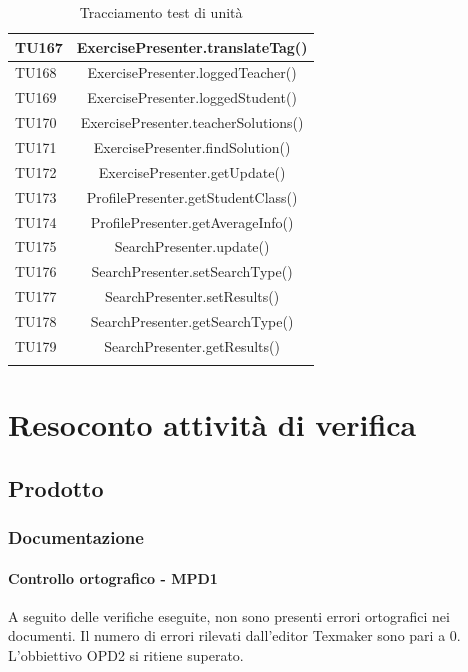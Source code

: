 \begin{longtable}{|>{\centering\arraybackslash}m{1.6cm}|c|}
		TU167 & ExercisePresenter.translateTag()\\ \hline
		TU168 & ExercisePresenter.loggedTeacher()\\ \hline
		\rowcolor{LightGray}
		TU169 & ExercisePresenter.loggedStudent()\\ \hline
		TU170 & ExercisePresenter.teacherSolutions()\\ \hline
		\rowcolor{LightGray}
		TU171 & ExercisePresenter.findSolution()\\ \hline
		TU172 & ExercisePresenter.getUpdate()\\ \hline
		\rowcolor{LightGray}
		TU173 & ProfilePresenter.getStudentClass()\\ \hline
		TU174 & ProfilePresenter.getAverageInfo()\\ \hline
		\rowcolor{LightGray}
		TU175 & SearchPresenter.update()\\ \hline
		TU176 & SearchPresenter.setSearchType()\\ \hline
		\rowcolor{LightGray}
		TU177 & SearchPresenter.setResults()\\ \hline
		TU178 & SearchPresenter.getSearchType()\\ \hline
		\rowcolor{LightGray}
		TU179 & SearchPresenter.getResults()\\ \hline
		
		\caption{Tracciamento test di unità}
\end{longtable}

	
\newpage
\section{Resoconto attività di verifica}
\subsection{Prodotto}
\subsubsection{Documentazione}
\paragraph{Controllo ortografico - MPD1\\}
A seguito delle verifiche eseguite, non sono presenti errori ortografici nei documenti. Il numero di errori rilevati dall'editor Texmaker sono pari a 0.\\
L'obbiettivo OPD2 si ritiene superato.


